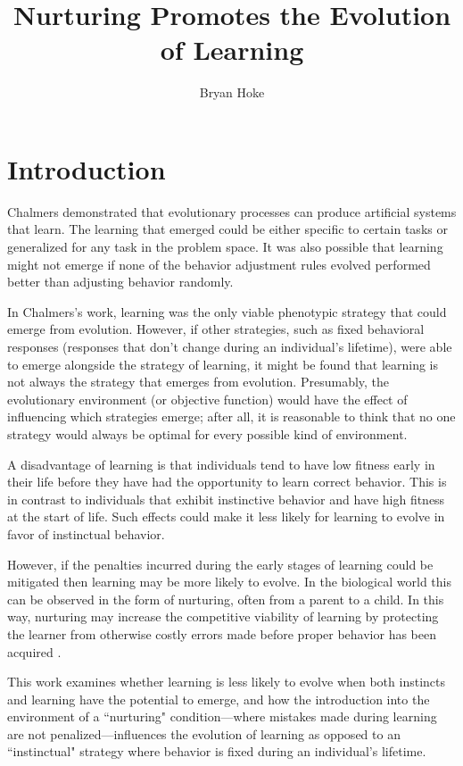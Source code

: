 \documentclass[master]{outhesis}
\title{Nurturing Promotes the Evolution of Learning}
\author{Bryan Hoke}
\begin{document}
\makefrontmatter

\chapter{Introduction}

Chalmers \cite{chalmers-evolution-learning} demonstrated that evolutionary processes can produce artificial systems that learn.
The learning that emerged could be either specific to certain tasks or generalized for any task in the problem space.
It was also possible that learning might not emerge if none of the behavior adjustment rules evolved performed better than adjusting behavior randomly.

In Chalmers's work, learning was the only viable phenotypic strategy that could emerge from evolution.
However, if other strategies, such as fixed behavioral responses (responses that don't change during an individual's lifetime), were able to emerge alongside the strategy of learning, it might be found that learning is not always the strategy that emerges from evolution.
Presumably, the evolutionary environment (or objective function) would have the effect of influencing which strategies emerge; after all, it is reasonable to think that no one strategy would always be optimal for every possible kind of environment. %

A disadvantage of learning is that individuals tend to have low fitness early in their life before they have had the opportunity to learn correct behavior.
This is in contrast to individuals that exhibit instinctive behavior and have high fitness at the start of life.
Such effects could make it less likely for learning to evolve in favor of instinctual behavior.

However, if the penalties incurred during the early stages of learning could be mitigated then learning may be more likely to evolve.
In the biological world this can be observed in the form of nurturing, often from a parent to a child.
In this way, nurturing may increase the competitive viability of learning by protecting the learner from otherwise costly errors made before proper behavior has been acquired \cite{nurturing-definition}.
                                                                                                                                    
This work examines whether learning is less likely to evolve when both instincts and learning have the potential to emerge,
and how the introduction into the environment of a ``nurturing" condition---where mistakes made during learning are not penalized---influences the evolution of learning as opposed to an ``instinctual" strategy where behavior is fixed during an individual's lifetime.
\end{document}
